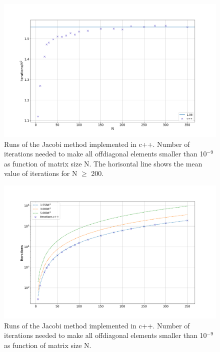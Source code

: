 \begin{figure}[H]
  \centering
  \includegraphics[width=1.0\textwidth]{../figures/iterations_compare_n2.png}
  \caption{Runs of the Jacobi method implemented in c++. Number of iterations
  needed to make all offdiagonal elements smaller than 10$^{-9}$ as function of
  matrix size N. The horisontal line shows the mean value of iterations for
  N $\geq$ 200.}

  \label{fig:iterations_scaled}
\end{figure}


\begin{figure}[H]
  \centering
  \includegraphics[width=1.0\textwidth]{../figures/iterations.png}

  \caption{Runs of the Jacobi method implemented in c++. Number of iterations
  needed to make all offdiagonal elements smaller than 10$^{-9}$ as function of
  matrix size N.}

  \label{fig:iterations}
\end{figure}


